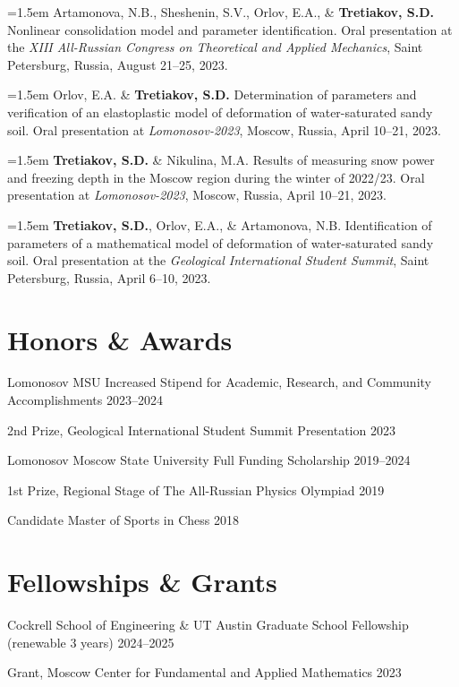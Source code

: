 \documentclass[11pt,letterpaper]{article}
\newcommand{\entrysimple}[2]{%
    #1 \hfill #2 \par
}
\newcommand{\pubentry}[1]{%
    {\interlinepenalty=10000 \hangindent=1.5em\hangafter=1 #1\par}\vspace{2pt}
}
\begin{document}
\pubentry{Artamonova, N.B., Sheshenin, S.V., Orlov, E.A., \& \textbf{Tretiakov, S.D.} Nonlinear consolidation model and parameter identification. Oral presentation at the \textit{XIII All-Russian Congress on Theoretical and Applied Mechanics}, Saint Petersburg, Russia, August 21--25, 2023.}

\pubentry{Orlov, E.A. \& \textbf{Tretiakov, S.D.} Determination of parameters and verification of an elastoplastic model of deformation of water-saturated sandy soil. Oral presentation at \textit{Lomonosov-2023}, Moscow, Russia, April 10--21, 2023.}

\pubentry{\textbf{Tretiakov, S.D.} \& Nikulina, M.A. Results of measuring snow power and freezing depth in the Moscow region during the winter of 2022/23. Oral presentation at \textit{Lomonosov-2023}, Moscow, Russia, April 10--21, 2023.}

\pubentry{\textbf{Tretiakov, S.D.}, Orlov, E.A., \& Artamonova, N.B. Identification of parameters of a mathematical model of deformation of water-saturated sandy soil. Oral presentation at the \textit{Geological International Student Summit}, Saint Petersburg, Russia, April 6--10, 2023.}

\section{Honors \& Awards}

\entrysimple{Lomonosov MSU Increased Stipend for Academic, Research, and Community Accomplishments}{2023--2024}
\entrysimple{2nd Prize, Geological International Student Summit Presentation}{2023}
\entrysimple{Lomonosov Moscow State University Full Funding Scholarship}{2019--2024}
\entrysimple{1st Prize, Regional Stage of The All-Russian Physics Olympiad}{2019}
\entrysimple{Candidate Master of Sports in Chess}{2018}

\section{Fellowships \& Grants}

\entrysimple{Cockrell School of Engineering \& UT Austin Graduate School Fellowship (renewable 3 years)}{2024--2025}
\entrysimple{Grant, Moscow Center for Fundamental and Applied Mathematics}{2023}
\end{document}
